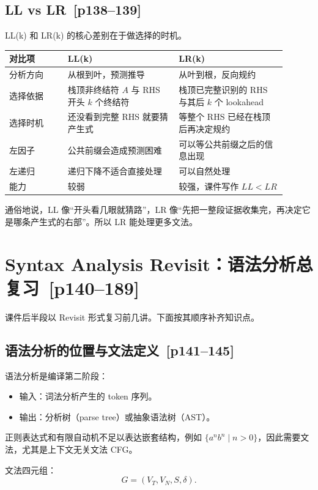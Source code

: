 \documentclass[UTF8,fontset=none,11pt]{ctexart}
\newcommand{\pg}[1]{\texorpdfstring{{\small\color{graytext}\,[p#1]}}{ [p#1]}}
\begin{document}
\subsection{LL vs LR \pg{138--139}}

LL(k) 和 LR(k) 的核心差别在于做选择的时机。

\begin{longtable}{L{0.19\linewidth}L{0.36\linewidth}L{0.35\linewidth}}
\toprule
对比项 & LL(k) & LR(k) \\
\midrule
分析方向 & 从根到叶，预测推导 & 从叶到根，反向规约 \\
选择依据 & 栈顶非终结符 \(A\) 与 RHS 开头 \(k\) 个终结符 & 栈顶已完整识别的 RHS 与其后 \(k\) 个 lookahead \\
选择时机 & 还没看到完整 RHS 就要猜产生式 & 等整个 RHS 已经在栈顶后再决定规约 \\
左因子 & 公共前缀会造成预测困难 & 可以等公共前缀之后的信息出现 \\
左递归 & 递归下降不适合直接处理 & 可以自然处理 \\
能力 & 较弱 & 较强，课件写作 \(LL<LR\) \\
\bottomrule
\end{longtable}

通俗地说，LL 像“开头看几眼就猜路”，LR 像“先把一整段证据收集完，再决定它是哪条产生式的右部”。所以 LR 能处理更多文法。

\section{Syntax Analysis Revisit：语法分析总复习 \pg{140--189}}

课件后半段以 Revisit 形式复习前几讲。下面按其顺序补齐知识点。

\subsection{语法分析的位置与文法定义 \pg{141--145}}

语法分析是编译第二阶段：

\begin{itemize}
  \item 输入：词法分析产生的 token 序列。
  \item 输出：分析树（parse tree）或抽象语法树（AST）。
\end{itemize}

正则表达式和有限自动机不足以表达嵌套结构，例如 \(\{a^n b^n\mid n>0\}\)，因此需要文法，尤其是上下文无关文法 CFG。

文法四元组：
\[
G=(V_T,V_N,S,\delta).
\]
\end{document}
